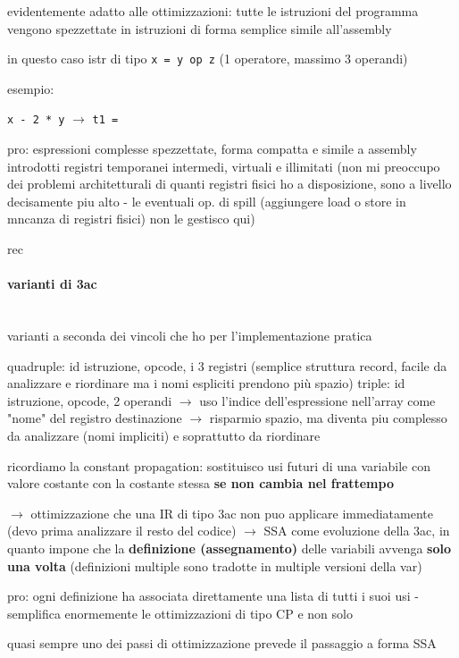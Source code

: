 evidentemente adatto alle ottimizzazioni: tutte le istruzioni del programma vengono spezzettate in istruzioni di forma semplice simile all'assembly

in questo caso istr di tipo \lstinline|x = y op z| (1 operatore, massimo 3 operandi)

esempio:

\lstinline|x - 2 * y| $\rightarrow$ \lstinline|t1 = |

pro: espressioni complesse spezzettate, forma compatta e simile a assembly
introdotti registri temporanei intermedi, virtuali e illimitati (non mi preoccupo dei problemi architetturali di quanti registri fisici ho a disposizione, sono a livello decisamente piu alto - le eventuali op. di spill (aggiungere load o store in mncanza di registri fisici) non le gestisco qui)

rec

\paragraph{varianti di 3ac}~\\

varianti a seconda dei vincoli che ho per l'implementazione pratica

quadruple: id istruzione, opcode, i 3 registri (semplice struttura record, facile da analizzare e riordinare ma i nomi espliciti prendono pi\`u spazio)
triple: id istruzione, opcode, 2 operandi $\rightarrow$ uso l'indice dell'espressione nell'array come "nome" del registro destinazione $\rightarrow$ risparmio spazio, ma diventa piu complesso da analizzare (nomi impliciti) e soprattutto da riordinare


ricordiamo la constant propagation: sostituisco usi futuri di una variabile con valore costante con la costante stessa \textbf{se non cambia nel frattempo}

$\rightarrow$ ottimizzazione che una IR di tipo 3ac non puo applicare immediatamente (devo prima analizzare il resto del codice) $\rightarrow$ SSA come evoluzione della 3ac, in quanto impone che la \textbf{definizione (assegnamento)} delle variabili avvenga \textbf{solo una volta} (definizioni multiple sono tradotte in multiple versioni della var)

pro: ogni definizione ha associata direttamente una lista di tutti i suoi usi - semplifica enormemente le ottimizzazioni di tipo CP e non solo

quasi sempre uno dei passi di ottimizzazione prevede il passaggio a forma SSA

